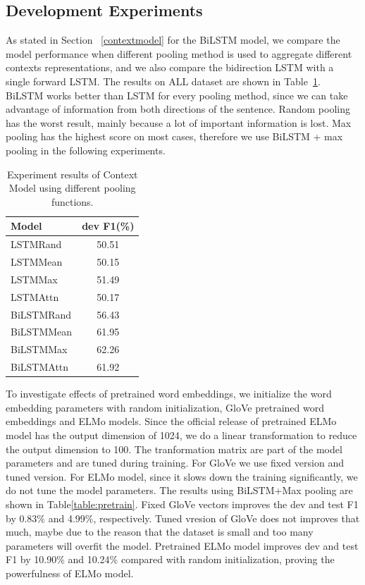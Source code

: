 \documentclass[11pt,a4paper]{article}
\begin{document}
\subsection{Development Experiments}

As stated in Section ~\ref{contextmodel} for the BiLSTM model, we compare the model performance when different pooling method is used to aggregate different contexts representations, and we also compare the bidirection LSTM with a single forward LSTM. The results on ALL dataset are shown in Table~\ref{table:BoEresult}. BiLSTM works better than LSTM for every pooling method, since we can take advantage of information from both directions of the sentence. Random pooling has the worst result, mainly because a lot of important information is lost. Max pooling has the highest score on most cases, therefore we use BiLSTM + max pooling in the following experiments.

\begin{table}[t!]
\centering
\begin{tabular}{l c}
\hline 
{\bf Model} & {\bf dev F1(\%) }\\ 
\hline\hline
LSTMRand & 50.51 \\
LSTMMean & 50.15 \\
LSTMMax & 51.49 \\
LSTMAttn & 50.17 \\ 
\hline
BiLSTMRand & 56.43 \\
BiLSTMMean & 61.95 \\
BiLSTMMax  & 62.26 \\
BiLSTMAttn & 61.92 \\ 
\hline
\end{tabular}
\caption{Experiment results of Context Model using different pooling functions.}
\label{table:BoEresult}
\end{table}

To investigate effects of pretrained word embeddings, we initialize the word embedding parameters with random initialization, GloVe pretrained word embeddings and ELMo models. Since the official release of pretrained ELMo model has the output dimension of 1024, we do a linear transformation to reduce the output dimension to 100. The tranformation matrix are part of the model parameters and are tuned during training. For GloVe we use fixed version and tuned version. For ELMo model, since it slows down the training significantly, we do not tune the model parameters. The results using BiLSTM+Max pooling are shown in Table\ref{table:pretrain}. Fixed GloVe vectors improves the dev and test F1 by 0.83\% and 4.99\%, respectively. Tuned vresion of GloVe does not improves that much, maybe due to the reason that the dataset is small and too many parameters will overfit the model. Pretrained ELMo model improves dev and test F1 by 10.90\% and 10.24\% compared with random initialization, proving the powerfulness of ELMo model.
\end{document}
